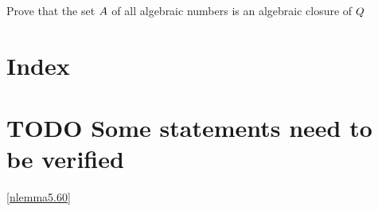 \documentclass[11pt]{article}
\begin{document}
\begin{exercise}
\label{nex5.46}
Prove that the set \(\relax{A}\) of all algebraic numbers is an algebraic closure of \(\relax{Q}\)
\end{exercise}
\section{Index}
\label{sec:org229391c}
\renewcommand{\indexname}{}
\printindex
\section{{\bfseries\sffamily TODO} Some statements need to be verified}
\label{sec:org4307224}
\ref{nlemma5.60}
\end{document}
